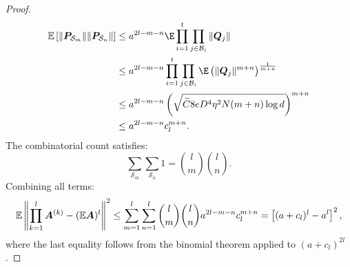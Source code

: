 \begin{proof}
\begin{align*}
    \mathbb{E} \left[ \|\mP_{\mathcal{S}_m}\| \|\mP_{\mathcal{S}_n}\| \right] &\leq a^{2l - m - n} \E\prod_{i=1}^t\prod_{j\in\cB_i}\|\mQ_j\|\\
    &\leq a^{2l - m - n} \prod_{i=1}^t\prod_{j\in\cB_i}\E\left(\|\mQ_j\|^{m+n}\right)^{\frac{1}{m+n}}\\
    &\leq a^{2l - m - n} \left( \sqrt{\widetilde{C}8eD^4\eta^2N (m+n) \log d} \right)^{m+n} \\
    &\leq a^{2l - m - n} c_l^{m + n}.
\end{align*}
The combinatorial count satisfies:
\[
\sum_{\mathcal{S}_m} \sum_{\mathcal{S}_n} 1 = \binom{l}{m} \binom{l}{n}.
\]
Combining all terms:
\[
\mathbb{E}\left\|\prod_{k=1}^l{\bm{A}}^{(k)} - (\mathbb{E}{\bm{A}})^l \right\|^2 \leq \sum_{m=1}^l \sum_{n=1}^l \binom{l}{m} \binom{l}{n} a^{2l - m - n} c_l^{m + n} = \left[ (a + c_l)^l - a^l \right]^2,
\]
where the last equality follows from the binomial theorem applied to \((a + c_l)^{2l}\).
\end{proof}

